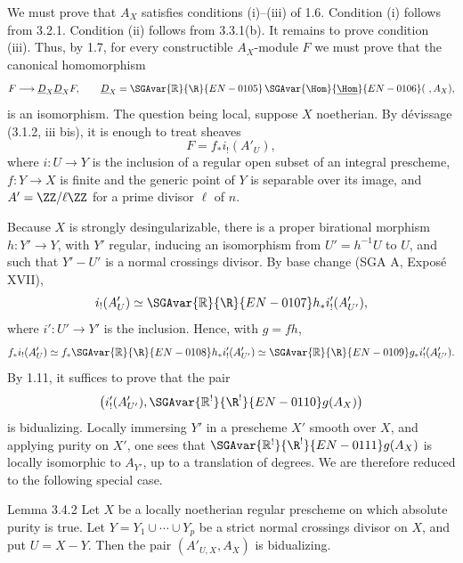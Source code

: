 \begin{prooftext}
We must prove that $A_X$ satisfies conditions (i)--(iii) of 1.6. Condition (i) follows from 3.2.1. Condition (ii) follows from 3.3.1(b). It remains to prove condition (iii). Thus, by 1.7, for every constructible $A_X$-module $F$ we must prove that the canonical homomorphism
\[
   F\longrightarrow \underline D_X\underline D_XF,
   \qquad \underline D_X=\SGAvar{\mathbb{R}}{\R}{EN-0105}\,\SGAvar{\Hom}{\underline{\Hom}}{EN-0106}(\ ,A_X),
\]
is an isomorphism. The question being local, suppose $X$ noetherian. By dévissage (3.1.2, iii bis), it is enough to treat sheaves
\[
   F=f_*i_!(A'_U),
\]
where $i:U\to Y$ is the inclusion of a regular open subset of an integral prescheme, $f:Y\to X$ is finite and the generic point of $Y$ is separable over its image, and $A'=\ZZ/\ell\ZZ$ for a prime divisor $\ell$ of $n$.

Because $X$ is strongly desingularizable, there is a proper birational morphism $h:Y'\to Y$, with $Y'$ regular, inducing an isomorphism from $U'=h^{-1}U$ to $U$, and such that $Y'-U'$ is a normal crossings divisor. By base change (SGA A, Exposé XVII),
\[
   i_!(A'_U)\simeq\SGAvar{\mathbb{R}}{\R}{EN-0107} h_*i'_!(A'_{U'}),
\]
where $i':U'\to Y'$ is the inclusion. Hence, with $g=fh$,
\[
   f_*i_!(A'_U)
     \simeq f_*\SGAvar{\mathbb{R}}{\R}{EN-0108} h_*i'_!(A'_{U'})
     \simeq \SGAvar{\mathbb{R}}{\R}{EN-0109} g_*i'_!(A'_{U'}).
\]
By 1.11, it suffices to prove that the pair
\[
   \bigl(i'_!(A'_{U'}),\SGAvar{\mathbb{R}^!}{\R^!}{EN-0110}g(A_X)\bigr)
\]
is bidualizing. Locally immersing $Y'$ in a prescheme $X'$ smooth over $X$, and applying purity on $X'$, one sees that $\SGAvar{\mathbb{R}^!}{\R^!}{EN-0111}g(A_X)$ is locally isomorphic to $A_{Y'}$, up to a translation of degrees. We are therefore reduced to the following special case.
\end{prooftext}

\begin{statement}{Lemma 3.4.2}
Let $X$ be a locally noetherian regular prescheme on which absolute purity is true. Let $Y=Y_1\cup\cdots\cup Y_p$ be a strict normal crossings divisor on $X$, and put $U=X-Y$. Then the pair $(A'_{U,X},A_X)$ is bidualizing.
\end{statement}

